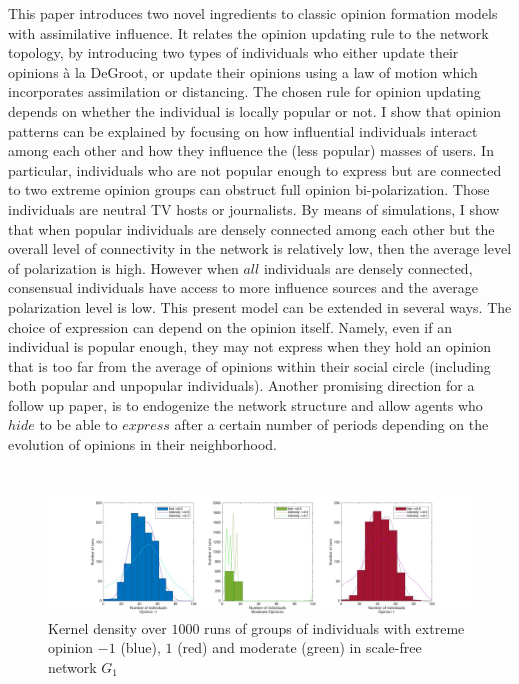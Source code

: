 \documentclass{article}
\begin{document}
This paper introduces two novel ingredients to classic opinion formation models with assimilative influence. It relates the opinion updating rule to the network topology, by introducing two types of individuals who either update their opinions \`{a} la DeGroot, or update their opinions using a law of motion which incorporates assimilation or distancing. The chosen rule for opinion updating depends on whether the individual is locally popular or not. I show that opinion patterns can be explained by focusing on how influential individuals interact among each other and how they influence the (less popular) masses of users. In particular, individuals who are not popular enough to express but are connected to two extreme opinion groups can obstruct full opinion bi-polarization. Those individuals are neutral TV hosts or journalists. By means of simulations, I show that when popular individuals are densely connected among each other but the overall level of connectivity in the network is relatively low, then the average level of polarization is high. However when $all$ individuals are densely connected, consensual individuals have access to more influence sources and the average polarization level is low. This present model can be extended in several ways. The choice of expression can depend on the opinion itself. Namely, even if an individual is popular enough, they may not express when they hold an opinion that is too far from the average of opinions within their social circle (including both popular and unpopular individuals). Another promising direction for a follow up paper, is to endogenize the network structure and allow agents who $hide$ to be able to $express$ after a certain number of periods depending on the evolution of opinions in their neighborhood. 


\clearpage
\section*{}
\begin{figure}[]
\hspace{-2cm}
\includegraphics[scale=0.24]{img/SF_ksdensity_A5_max.jpg}
\caption{Kernel density over $1000$ runs of groups of individuals with extreme opinion $-1$ (blue), $1$ (red) and moderate (green) in scale-free network $G_1$}
\label{ksdensity_A5}
\end{figure}
\end{document}
